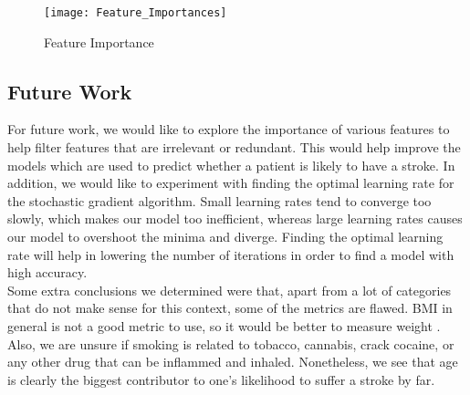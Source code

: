 \begin{figure}[ht]
    \centering
    \texttt{[image: Feature\_Importances]}
    \caption{Feature Importance}
    \label{fig:Figure7}
\end{figure}

\subsection{Future Work}
\label{sec:conclusion: Future Work}


\noindent For future work, we would like to explore the importance of various features to help filter features that are irrelevant or redundant. This would help improve the models which are used to predict whether a patient is likely to have a stroke. In addition, we would like to experiment with finding the optimal learning rate for the stochastic gradient algorithm. Small learning rates tend to converge too slowly, which makes our model too inefficient, whereas large learning rates causes our model to overshoot the minima and diverge. Finding the optimal learning rate will help in lowering the number of iterations in order to find a model with high accuracy.\\

\noindent Some extra conclusions we determined were that, apart from a lot of categories that do not make sense for this context, some of the metrics are flawed. BMI in general is not a good metric to use, so it would be better to measure weight \cite{BMI}. Also, we are unsure if smoking is related to tobacco, cannabis, crack cocaine, or any other drug that can be inflammed and inhaled. Nonetheless, we see that age is clearly the biggest contributor to one's likelihood to suffer a stroke by far.